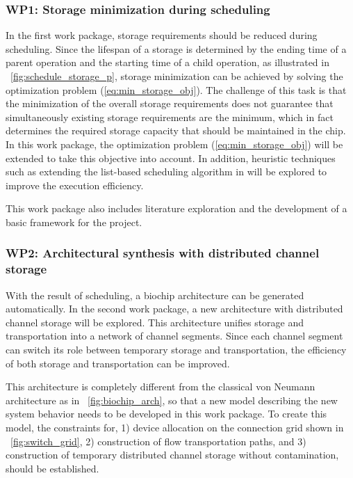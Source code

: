 \subsubsection{WP1: Storage minimization during scheduling}
In the first work package, storage requirements should be reduced during
scheduling. Since the lifespan of a storage is determined by the
ending time of a parent operation and the starting time of a child operation,
as illustrated in \figname~\ref{fig:schedule_storage_p}, storage minimization
can be achieved by solving the optimization problem
(\ref{eq:min_storage_obj}). The challenge of this task is that the minimization
of the overall storage requirements does not guarantee that simultaneously
existing storage requirements are the minimum, which in fact 
determines the required storage capacity that should be maintained in the
chip. In this work package, the optimization problem 
(\ref{eq:min_storage_obj}) will be extended to take this objective into 
account. In addition, heuristic techniques such as extending the list-based
scheduling algorithm in \cite{Micheli94} will be explored to improve the
execution efficiency. 

This work package also includes literature exploration and the development of
a basic framework for the project.

\subsubsection{WP2: Architectural synthesis with distributed channel storage}

With the result of scheduling, a biochip architecture can be generated 
automatically. In the second work package, a new
architecture with distributed channel storage will be explored. This
architecture unifies storage and transportation into a network of channel
segments. Since each channel segment can switch its role between temporary storage 
and transportation, the efficiency of both storage and transportation can be
improved.

This architecture is completely different from the classical von Neumann
architecture as in \figname~\ref{fig:biochip_arch}, 
so that a new model describing the new system behavior needs to
be developed in this work package. To create this model, the constraints for, 1)
device allocation on the connection grid shown in \figname~\ref{fig:switch_grid}, 2) construction of flow
transportation paths, and 3) construction of temporary distributed channel 
storage without contamination, should be established. 

